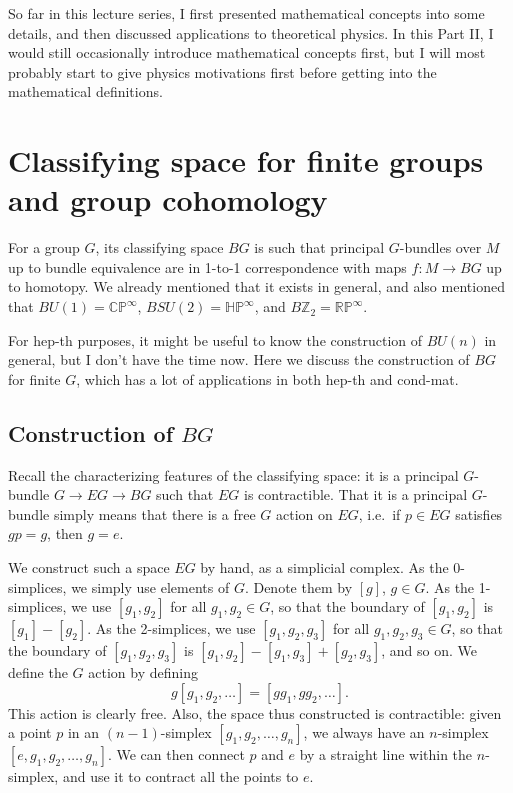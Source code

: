 \documentclass[12pt]{article}
\numberwithin{equation}{section}
\numberwithin{figure}{section}
\theoremstyle{remark}
\def\bZ{\mathbb{Z}}
\def\RP{\mathbb{RP}}
\def\CP{\mathbb{CP}}
\def\HP{\mathbb{HP}}
\begin{document}
So far in this lecture series, I first presented mathematical concepts into some details,
and then discussed applications to theoretical physics. 
In this Part II, I would still occasionally introduce mathematical concepts first,
but I will most probably start to give physics motivations first
before getting into the mathematical definitions.

\section{Classifying space for finite groups and group cohomology}

For a group $G$, its classifying space $BG$ is such that principal $G$-bundles over $M$
up to bundle equivalence are in 1-to-1 correspondence with
maps $f:M\to BG$  up to homotopy.
We already mentioned that it exists in general,
and also mentioned that $BU(1)=\CP^\infty$, $BSU(2)=\HP^\infty$, and $B\bZ_2=\RP^\infty$.

For hep-th purposes, it might be useful to know the construction of $BU(n)$ in general, 
but I don't have the time now.
Here we discuss the construction of $BG$ for finite $G$, which has a lot of applications
in both hep-th and cond-mat.

\subsection{Construction of $BG$}

Recall the characterizing features of the classifying space: it is a principal $G$-bundle
$G\to EG\to BG$ such that $EG$ is contractible. 
That it is a principal $G$-bundle simply means that there is a free $G$ action on $EG$,
i.e.~if $p\in EG$ satisfies $gp=g$, then $g=e$. 

We construct such a space $EG$ by hand, as a simplicial complex.
As the 0-simplices, we simply use elements of $G$. Denote them by $[g]$, $g\in G$.
As the 1-simplices, we use $[g_1,g_2]$ for all $g_1,g_2\in G$,
so that the boundary of $[g_1,g_2]$ is $[g_1]-[g_2]$.
As the 2-simplices, we use $[g_1,g_2,g_3]$ for all $g_1,g_2,g_3\in G$,
so that the boundary of $[g_1,g_2,g_3]$ is $[g_1,g_2]-[g_1,g_3]+[g_2,g_3]$,
and so on.
We define the $G$ action by defining \begin{equation}
g[g_1,g_2,\ldots] = [gg_1,gg_2,\ldots].
\end{equation}
This action is clearly free.
Also, the space thus constructed is contractible: 
given a point $p$ in an $(n-1)$-simplex $[g_1,g_2,\ldots, g_{n}]$,
we always have an $n$-simplex $[e,g_1,g_2,\ldots,g_n]$.
We can then connect  $p$ and $e$ by a straight line within the $n$-simplex,
and use it to contract all the points to $e$.
\end{document}
